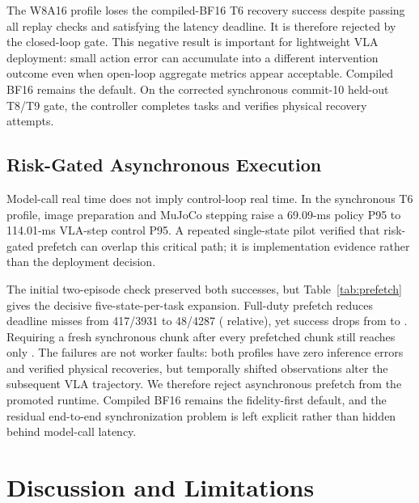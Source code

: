 \documentclass[runningheads]{waica}
\begin{document}
The W8A16 profile loses the compiled-BF16 T6 recovery success despite passing
all replay checks and satisfying the latency deadline. It is therefore rejected
by the closed-loop gate. This negative result is important for lightweight VLA
deployment: small action error can accumulate into a different intervention
outcome even when open-loop aggregate metrics appear acceptable. Compiled BF16
remains the default. On the corrected synchronous commit-10 held-out T8/T9
gate, the controller completes \CarveSyncTenSuccess{} tasks and verifies
\CarveSyncTenRecovery{} physical recovery attempts.

\subsection{Risk-Gated Asynchronous Execution}

Model-call real time does not imply control-loop real time. In the synchronous
T6 profile, image preparation and MuJoCo stepping raise a 69.09-ms policy P95
to 114.01-ms VLA-step control P95. A repeated single-state pilot verified that
risk-gated prefetch can overlap this critical path; it is implementation
evidence rather than the deployment decision.

The initial two-episode check preserved both successes, but
Table~\ref{tab:prefetch} gives the decisive five-state-per-task expansion.
Full-duty prefetch reduces deadline misses from 417/3931 to 48/4287
(\CarveRealtimeMissReduction{} relative), yet success drops from
\CarveSyncEightSuccess{} to \CarveAsyncSuccess{}. Requiring a fresh synchronous
chunk after every prefetched chunk still reaches only
\CarveAsyncIntervalSuccess{}. The failures are not worker faults: both profiles
have zero inference errors and verified physical recoveries, but temporally
shifted observations alter the subsequent VLA trajectory. We therefore reject
asynchronous prefetch from the promoted runtime. Compiled BF16 remains the
fidelity-first default, and the residual end-to-end synchronization problem is
left explicit rather than hidden behind model-call latency.



\section{Discussion and Limitations}
\label{sec:discussion}
\end{document}
